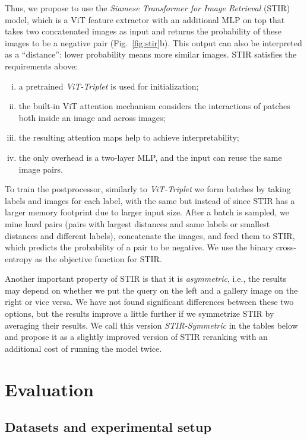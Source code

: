 \documentclass{article}
\begin{document}
Thus, we propose to use the \emph{Siamese Transformer for Image Retrieval} (STIR) model, which is a ViT feature extractor with an additional MLP on top that takes two concatenated images as input and returns the probability of these images to be a negative pair (Fig.~\ref{fig:stir}b). This output can also be interpreted as a ``distance'': lower probability means more similar images. STIR satisfies the requirements above:
\begin{enumerate}[(i)]
    \item a pretrained \emph{ViT-Triplet} is used for initialization;
    \item the built-in ViT attention mechanism considers the interactions of patches both inside an image and across images;
    \item the resulting attention maps help to achieve interpretability;
    \item the only overhead is a two-layer MLP, and the input can reuse the same image pairs.
\end{enumerate}

To train the postprocessor, similarly to \emph{ViT-Triplet} we form batches by taking  labels and  images for each label, with the same  but  instead of  since STIR has a larger memory footprint due to larger input size. After a batch is sampled, we mine hard pairs (pairs with largest distances and same labels or smallest distances and different labels), concatenate the images, and feed them to STIR, which predicts the
probability of a pair to be negative.
We use the binary cross-entropy as the objective function for STIR.

Another important property of STIR is that it is \emph{asymmetric}, i.e., the results may depend on whether we put the query on the left and a gallery image on the right or vice versa. We have not found significant differences between these two options, but the results improve a little further if we symmetrize STIR by averaging their results. We call this version \emph{STIR-Symmetric} in the tables below and propose it as a slightly improved version of STIR reranking with an additional cost of running the model twice.


\section{Evaluation}\label{sec:eval}

\subsection{Datasets and experimental setup}\label{sec:data}
\end{document}
